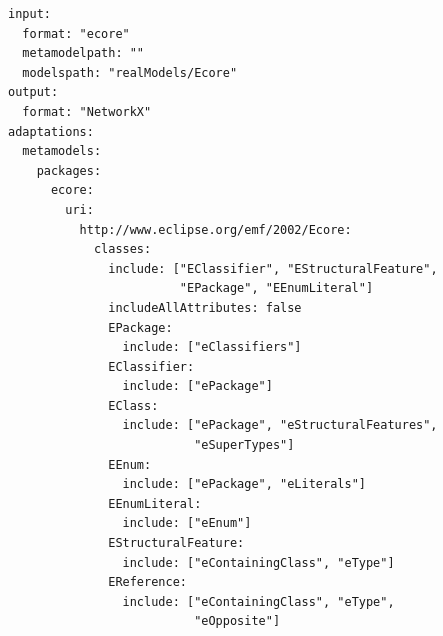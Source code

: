 \documentclass[journal,article,submit,moreauthors,technologies]{Definitions/mdpi}
\newcommand{\rev}[1]{\textcolor{blue}{#1}}
\begin{document}
\begin{program_}[H]
\footnotesize
\begin{verbatim}
input:
  format: "ecore"
  metamodelpath: ""
  modelspath: "realModels/Ecore"
output:
  format: "NetworkX"
adaptations:
  metamodels:
    packages:
      ecore:
        uri:
          http://www.eclipse.org/emf/2002/Ecore:
            classes:
              include: ["EClassifier", "EStructuralFeature",
                        "EPackage", "EEnumLiteral"]
              includeAllAttributes: false
              EPackage:
                include: ["eClassifiers"]
              EClassifier:
                include: ["ePackage"]
              EClass:
                include: ["ePackage", "eStructuralFeatures",
                          "eSuperTypes"]
              EEnum:
                include: ["ePackage", "eLiterals"]
              EEnumLiteral:
                include: ["eEnum"]
              EStructuralFeature:
                include: ["eContainingClass", "eType"]
              EReference:
                include: ["eContainingClass", "eType",
                          "eOpposite"]
\end{verbatim}
\caption{\rev{The complete MoEGL configuration that replicates the Ecore encoder of Lopez et al.~\cite{lopez2022generating} (29 lines of YAML).}}
\label{code:yamlyakindu}
\end{program_}
\end{document}
